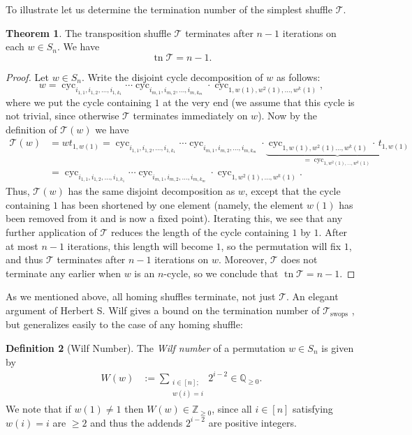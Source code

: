 \documentclass[final,nomarks]{dmtcs-episciences}
\theoremstyle{definition}
\newtheorem{thm}{Theorem}[section]
\theoremstyle{definition}
\newtheorem{defn}[thm]{Definition}
\theoremstyle{remark}
\newcommand{\T}{\mathcal{T}} %
\newcommand{\Ts}{\mathcal{T}_{\text{swops}}} %
\newcommand{\tn}{\operatorname{tn }} %
\newcommand{\tup}[1]{\left( #1 \right)}
\newcommand{\cyc}[1]{\operatorname{cyc}_{#1}}
\begin{document}
To illustrate let us determine the termination number of the simplest shuffle $ \T $.

\begin{thm}
\label{T-n-1}
The transposition shuffle $\T$ terminates after $ n-1 $ iterations on each $w \in S_n$. We have
   \[
   \tn\T = n - 1.
   \]
\end{thm}
\begin{proof}
Let $ w \in S_{n} $. Write the disjoint cycle decomposition of $ w $ as follows:
\[
w = \cyc{i_{1,1},i_{1,2},\dots,i_{1,k_{1}}} \cdots \cyc{i_{m,1},i_{m,2},\dots,i_{m,k_{m}}} \cdot \cyc{1,w\tup{ 1 },w^{2}\tup{ 1 },\dots,w^{k}\tup{ 1 }} ,
\]
where we put the cycle containing $1$ at the very end (we assume that this cycle is not trivial, since otherwise $\T$ terminates immediately on $w$).
Now by the definition of $ \T\tup{ w } $ we have
\begin{align*}
    \T\tup{ w } &= w t_{1,w\tup{ 1 }}
                = \cyc{i_{1,1},i_{1,2},\dots,i_{1,k_{1}}} \cdots \cyc{i_{m,1},i_{m,2},\dots,i_{m,k_{m}}} 
                \cdot \underbrace{\cyc{1,w\tup{ 1 },w^{2}\tup{ 1 }\dots,w^{k}\tup{ 1 }} \cdot \, t_{1,w\tup{ 1 }}}_{
                =\cyc{1,w^{2}\tup{ 1 },\dots,w^{k}\tup{ 1 }}} 
                \\
                &= \cyc{i_{1,1},i_{1,2},\dots,i_{1,k_{1}}} \cdots \cyc{i_{m,1},i_{m,2},\dots,i_{m,k_{m}}} \cdot \cyc{1,w^{2}\tup{ 1 },\dots,w^{k}\tup{ 1 }}.
\end{align*}
Thus, $\T\tup{w}$ has the same disjoint decomposition as $w$, except that the cycle containing $1$ has been shortened by one element (namely, the element $w\tup{1}$ has been removed from it and is now a fixed point).
Iterating this, we see that any further application of $\T$ reduces the length of the cycle containing $1$ by $1$. After at most $n-1$ iterations, this length will become $1$, so the permutation will fix $1$, and thus $\T$ terminates after $n-1$ iterations on $w$.
Moreover, $\T$ does not terminate any earlier when $w$ is an $n$-cycle, so we conclude that $ \tn\T = n - 1 $.
\end{proof}

As we mentioned above, all homing shuffles terminate, not just $\T$. An elegant argument of Herbert S. Wilf gives a bound on the termination number of $ \Ts $ \cite[Appendix to Chapter Six]{gardner2020}, but generalizes easily to the case of any homing shuffle:

\begin{defn}[Wilf Number]
The \emph{Wilf number} of a permutation $ w \in S_{n} $ is given by
   \begin{align*}
       W\tup{w} &:= \sum_{\substack{i \in [n];\\ w\tup{ i }=i}} 2^{i-2} \in \mathbb{Q}_{\geq 0}.
   \end{align*}
We note that if $w(1) \ne 1$ then $W(w) \in \mathbb{Z}_{\ge 0}$, since all $i \in [n]$ satisfying $w\tup{i} = i$ are $\geq 2$ and thus the addends $2^{i-2}$ are positive integers.
\end{defn}
\end{document}
